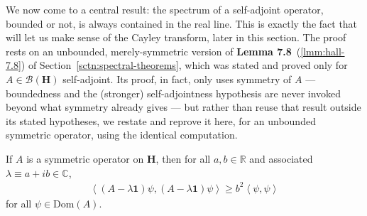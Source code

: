 We now come to a central result: the spectrum of a self-adjoint operator, bounded or not, is always contained in the real line. This is exactly the fact that will let us make sense of the Cayley transform, later in this section. The proof rests on an unbounded, merely-symmetric version of \textbf{Lemma 7.8}~(\ref{lmm:hall-7.8}) of Section~\ref{sctn:spectral-theorems}, which was stated and proved only for $A \in \mathcal{B}(\mathbf{H})$ self-adjoint. Its proof, in fact, only uses symmetry of $A$ — boundedness and the (stronger) self-adjointness hypothesis are never invoked beyond what symmetry already gives — but rather than reuse that result outside its stated hypotheses, we restate and reprove it here, for an unbounded symmetric operator, using the identical computation.

\begin{lemma}
    \label{lmm:b-squared-inequality-symmetric}
    \leanok
    If $A$ is a symmetric operator on $\mathbf{H}$, then for all $a, b \in \mathbb{R}$ and associated $\lambda \equiv a + ib \in \mathbb{C}$,
    \begin{align}
        \left< (A - \lambda\mathbf{1})\psi, (A - \lambda\mathbf{1})\psi \right> \ge b^2 \left< \psi, \psi \right>
    \end{align}
    for all $\psi \in \text{Dom}(A)$.
\end{lemma}
